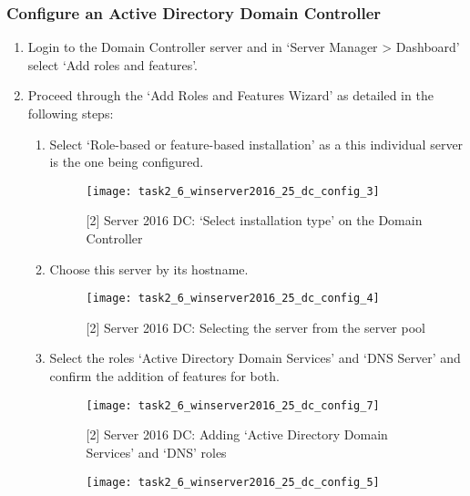 
\subsubsection{Configure an Active Directory Domain Controller}
\begin{enumerate}[series=task2methodology3]
  \item Login to the Domain Controller server and in `Server Manager > Dashboard' select `Add roles and features'.
  \item Proceed through the `Add Roles and Features Wizard' as detailed in the following steps:
   \begin{enumerate}[label=(\alph*)]
     \item Select `Role-based or feature-based installation' as a this individual server is the one being configured.
       \begin{figure}[H]
         \centering
         \captionsetup{skip=2pt}
         \texttt{[image: task2\_6\_winserver2016\_25\_dc\_config\_3]}
         \caption{[2] Server 2016 DC: `Select installation type' on the Domain Controller}
         \label{fig:task2:vspherec_windc2_c3}
       \end{figure}
      \item Choose this server by its hostname.
        \begin{figure}[H]
          \centering
          \captionsetup{skip=2pt}
          \texttt{[image: task2\_6\_winserver2016\_25\_dc\_config\_4]}
          \caption{[2] Server 2016 DC: Selecting the server from the server pool}
          \label{fig:task2:vspherec_windc2_c4}
        \end{figure}
      \item Select the roles `Active Directory Domain Services' and `DNS Server' and confirm the addition of features for both.
        \begin{figure}[H]
          \centering
          \captionsetup{skip=2pt}
          \texttt{[image: task2\_6\_winserver2016\_25\_dc\_config\_7]}
          \caption{[2] Server 2016 DC: Adding `Active Directory Domain Services' and `DNS' roles}
          \label{fig:task2:vspherec_windc2_c7}
        \end{figure}
        \begin{figure}[H]
          \centering
          \captionsetup{skip=2pt}
          \texttt{[image: task2\_6\_winserver2016\_25\_dc\_config\_5]}

\end{figure}
\end{enumerate}
\end{enumerate}

